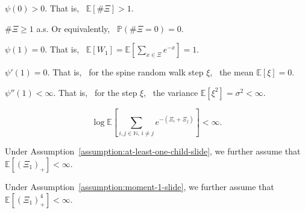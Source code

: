 \begin{assumption}\label{assumption:psi-zero-slide}
    $\psi(0)>0$. That is,~ $\mathbb E[\#\Xi]>1$.
\end{assumption}
\begin{assumption}\label{assumption:at-least-one-child-slide}
    $\#\Xi\ge 1$ a.s. Or equivalently,~ $\mathbb P(\#\Xi=0)=0$.
\end{assumption}
\begin{assumption}\label{assumption:psi-one-slide}
    $\psi(1)=0$. That is,~ $\mathbb E[W_1]=\mathbb E\left[\sum_{x\in\Xi}e^{-x}\right]=1$.
\end{assumption}
\begin{assumption}\label{assumption:psi-prime-one-slide}
    $\psi'(1)=0$. That is,~ for the spine random walk step $\xi$,~ the mean $\mathbb E[\xi]=0$.
\end{assumption}
\begin{assumption}\label{assumption:finite-variance-slide}
    $\psi''(1)<\infty$. That is,~ for the step $\xi$,~ the variance $\mathbb E[\xi^2]=\sigma^2<\infty$.
\end{assumption}
\begin{assumption}\label{assumption:log-expt-cross-sum-exp-neg-sum-slide}
    {
        \setlength\belowdisplayskip{0pt}
        \begin{equation*}
            \log\mathbb E\!\left[
                \sum_{
                    i,j\in\mathbb N,\,
                    i\neq j
                }
                e^{
                    -(\Xi_i+\Xi_j)
                }
            \right]
            <
            \infty.
        \end{equation*}
    }
\end{assumption}
\begin{assumption}\label{assumption:moment-1-slide}
    Under Assumption~\ref{assumption:at-least-one-child-slide}, we further assume that
    $\mathbb E[(\Xi_1)_+]<\infty$.
\end{assumption}
\begin{assumption}\label{assumption:moment-4-slide}
    Under Assumption~\ref{assumption:moment-1-slide}, we further assume that
    $\mathbb E[(\Xi_1)_+^4]<\infty$.
\end{assumption}
